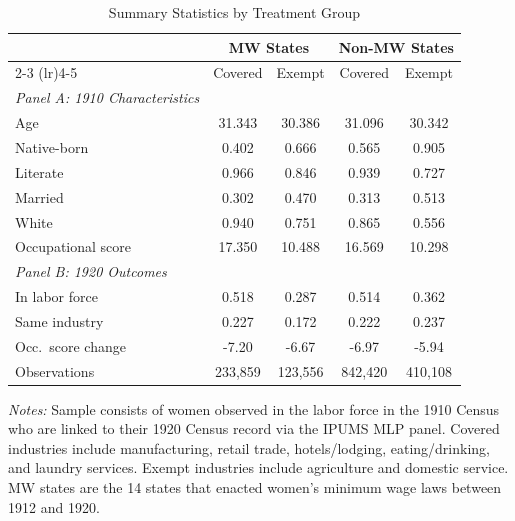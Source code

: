 \begin{table}[t]
\centering
\caption{Summary Statistics by Treatment Group}
\label{tab:sumstats}
\begin{tabular}{lcccc}
\toprule
 & \multicolumn{2}{c}{MW States} & \multicolumn{2}{c}{Non-MW States} \\
\cmidrule(lr){2-3} \cmidrule(lr){4-5}
 & Covered & Exempt & Covered & Exempt \\
\midrule
\textit{Panel A: 1910 Characteristics} \\[3pt]
Age & 31.343 & 30.386 & 31.096 & 30.342 \\
Native-born & 0.402 & 0.666 & 0.565 & 0.905 \\
Literate & 0.966 & 0.846 & 0.939 & 0.727 \\
Married & 0.302 & 0.470 & 0.313 & 0.513 \\
White & 0.940 & 0.751 & 0.865 & 0.556 \\
Occupational score & 17.350 & 10.488 & 16.569 & 10.298 \\
\midrule
\textit{Panel B: 1920 Outcomes} \\[3pt]
In labor force & 0.518 & 0.287 & 0.514 & 0.362 \\
Same industry & 0.227 & 0.172 & 0.222 & 0.237 \\
Occ.\ score change & -7.20 & -6.67 & -6.97 & -5.94 \\
\midrule
Observations & 233,859 & 123,556 & 842,420 & 410,108 \\
\bottomrule
\end{tabular}
\begin{tablenotes}
\small
\item \textit{Notes:} Sample consists of women observed in the labor force in the 1910 Census
who are linked to their 1920 Census record via the IPUMS MLP panel. Covered industries
include manufacturing, retail trade, hotels/lodging, eating/drinking, and laundry services.
Exempt industries include agriculture and domestic service. MW states are the 14 states
that enacted women's minimum wage laws between 1912 and 1920.
\end{tablenotes}
\end{table}
